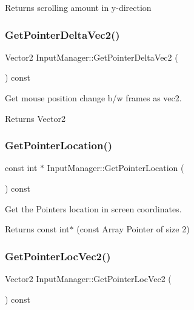 Returns scrolling amount in y-\/direction \mbox{\label{classInputManager_a48091a18d5c514a1dc8226aa4b134b4d}} 
\subsubsection{\texorpdfstring{Get\+Pointer\+Delta\+Vec2()}{GetPointerDeltaVec2()}}
{\footnotesize\ttfamily Vector2 Input\+Manager\+::\+Get\+Pointer\+Delta\+Vec2 (\begin{DoxyParamCaption}{ }\end{DoxyParamCaption}) const}



Get mouse position change b/w frames as vec2. 

\begin{DoxyReturn}{Returns}
Vector2 
\end{DoxyReturn}
\mbox{\label{classInputManager_ab8fb90f6385afb41d9d8212851c04061}} 
\subsubsection{\texorpdfstring{Get\+Pointer\+Location()}{GetPointerLocation()}}
{\footnotesize\ttfamily const int $\ast$ Input\+Manager\+::\+Get\+Pointer\+Location (\begin{DoxyParamCaption}{ }\end{DoxyParamCaption}) const}



Get the Pointer\textquotesingle{}s location in screen coordinates. 

\begin{DoxyReturn}{Returns}
const int$\ast$ (const Array Pointer of size 2) 
\end{DoxyReturn}
\mbox{\label{classInputManager_a6d5e2b6637bb959377f218bb4b3d748e}} 
\subsubsection{\texorpdfstring{Get\+Pointer\+Loc\+Vec2()}{GetPointerLocVec2()}}
{\footnotesize\ttfamily Vector2 Input\+Manager\+::\+Get\+Pointer\+Loc\+Vec2 (\begin{DoxyParamCaption}{ }\end{DoxyParamCaption}) const}



